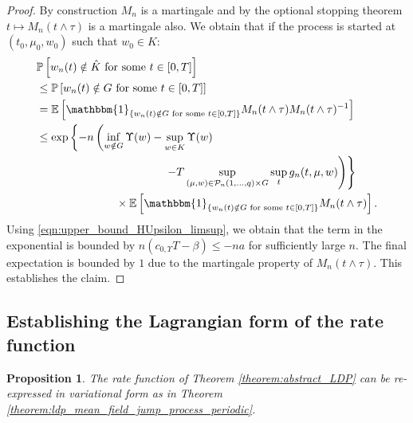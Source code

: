 \documentclass[a4paper]{article}
\newcommand{\cP}{\mathcal{P}}
\newcommand{\bE}{\mathbb{E}}
\newcommand{\PR}{\mathbb{P}}
\newcommand{\bONE}{\mathbbm{1}}
\numberwithin{equation}{section}
\newtheorem{proposition}[theorem]{Proposition}
\theoremstyle{definition}
\begin{document}
\begin{proof}
	By construction $M_n$ is a martingale and by the optional stopping theorem $t \mapsto M_n(t \wedge \tau)$ is a martingale also. We obtain that if the process is started at $(t_0,\mu_0,w_0)$ such that $w_0 \in K$:
	\begin{align*}
		& \PR\left[w_n(t) \notin  \hat{K} \text{ for some } t \in [0,T]\right] \\
		& \leq \PR\left[w_n(t) \notin  G \text{ for some } t \in [0,T]\right] \\
		& = \bE\left[\bONE_{\left\{w_n(t) \notin G \text{ for some } t \in [0,T]\right\}} M_n(t \wedge \tau) M_n(t\wedge \tau)^{-1} \right] \\
		& \leq \exp\left\{- n \left(\inf_{w \notin  G} \Upsilon(w) - \sup_{w \in K} \Upsilon(w) \right. \right. \\
		& \hspace{4cm} \left. \left. - T \sup_{(\mu,w) \in \cP_n(1,\dots,q) \times G} \sup_t g_n(t,\mu,w) \right) \right\} \\
		& \hspace{2.5cm} \times  \bE\left[\bONE_{\{w_n(t) \notin G \text{ for some } t \in [0,T]\}} M_n(t \wedge \tau) \right].
	\end{align*}
	Using \eqref{eqn:upper_bound_HUpsilon_limsup}, we obtain that the term in the exponential is bounded by $ n\left(c_{0,\Upsilon} T - \beta \right) \leq -n a$ for sufficiently large $n$. The final expectation is bounded by $1$ due to the martingale property of $M_n(t \wedge \tau)$. This establishes the claim.
	
	
\end{proof}




\subsection{Establishing the Lagrangian form of the rate function} \label{section:Lagrangian_form}



\begin{proposition} \label{proposition:variational_representation}
	The rate function of Theorem \ref{theorem:abstract_LDP} can be re-expressed in variational form as in Theorem \ref{theorem:ldp_mean_field_jump_process_periodic}.
\end{proposition}
\end{document}
